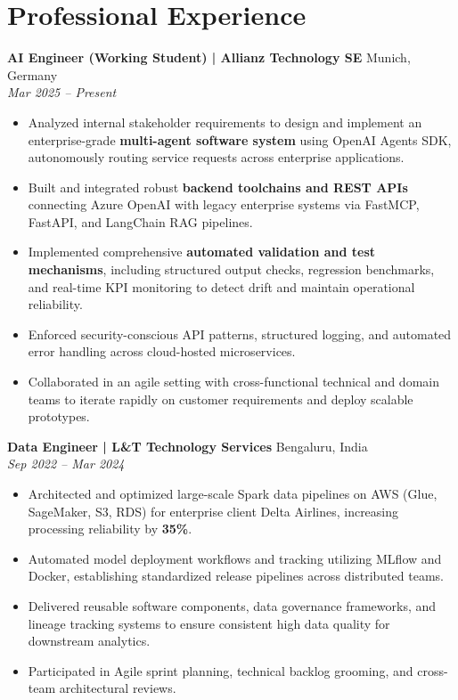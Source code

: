 \documentclass[8.5pt,a4paper]{article}
\begin{document}

\section{Professional Experience}

\textbf{AI Engineer (Working Student) \;|\; Allianz Technology SE} \hfill Munich, Germany\\
\textit{Mar 2025 -- Present}
\begin{itemize}
    \item Analyzed internal stakeholder requirements to design and implement an enterprise-grade \textbf{multi-agent software system} using OpenAI Agents SDK, autonomously routing service requests across enterprise applications.
    \item Built and integrated robust \textbf{backend toolchains and REST APIs} connecting Azure OpenAI with legacy enterprise systems via FastMCP, FastAPI, and LangChain RAG pipelines.
    \item Implemented comprehensive \textbf{automated validation and test mechanisms}, including structured output checks, regression benchmarks, and real-time KPI monitoring to detect drift and maintain operational reliability.
    \item Enforced security-conscious API patterns, structured logging, and automated error handling across cloud-hosted microservices.
    \item Collaborated in an agile setting with cross-functional technical and domain teams to iterate rapidly on customer requirements and deploy scalable prototypes.
\end{itemize}

\textbf{Data Engineer \;|\; L\&T Technology Services} \hfill Bengaluru, India\\
\textit{Sep 2022 -- Mar 2024}
\begin{itemize}
    \item Architected and optimized large-scale Spark data pipelines on AWS (Glue, SageMaker, S3, RDS) for enterprise client Delta Airlines, increasing processing reliability by \textbf{35\%}.
    \item Automated model deployment workflows and tracking utilizing MLflow and Docker, establishing standardized release pipelines across distributed teams.
    \item Delivered reusable software components, data governance frameworks, and lineage tracking systems to ensure consistent high data quality for downstream analytics.
    \item Participated in Agile sprint planning, technical backlog grooming, and cross-team architectural reviews.
\end{itemize}
\end{document}
